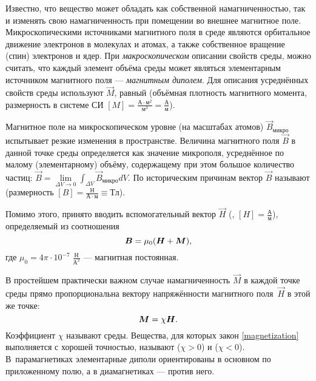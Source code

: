 
Известно, что вещество может обладать как собственной намагниченностью, так
и изменять свою намагниченность при помещении во внешнее магнитное поле.
Микроскопическими источниками магнитного поля в среде являются
орбитальное движение электронов в молекулах и атомах, а также собственное 
вращение (спин) электронов и ядер.
При \emph{макроскопическом} описании свойств среды, можно считать,
что каждый элемент объёма среды может являться элементарным источником
магнитного поля --- \emph{магнитным диполем}. Для описания усреднённых
свойств среды используют  $\vec{M}$, равный
(объёмная плотность магнитного момента, размерность в 
системе СИ $[M]=\frac{А\cdot м^2}{м^3}=\frac{А}{м}$).

Магнитное поле на микроскопическом уровне (на масштабах атомов) 
$\vec{B}_{\text{микро}}$ испытывает резкие изменения в пространстве.
Величина магнитного поля $\vec{B}$ в данной точке среды определяется как
значение микрополя, усреднённое по малому (элементарному) объёму, 
содержащему при этом большое количество частиц: 
$\vec{B}=\lim\limits_{\Delta V\to 0}\int_{\Delta V} \vec{B}_{микро}dV$.
По историческим причинам вектор $\vec{B}$ 
называют  (размерность $[B] = \frac{Н}{А\cdot м}\equiv  Тл$).

Помимо этого, принято вводить вспомогательный вектор $\vec{H}$
(, $[H]=\frac{А}{м}$), определяемый 
из соотношения
\begin{equation}
    \eqmark{fieldB}
    \vec{B} = \mu_0(\vec{H} + \vec{M}),
\end{equation}
где $\mu_0=4\pi \cdot 10^{-7}\;\frac{Н}{А^2}$ --- магнитная постоянная.

В простейшем практически важном случае намагниченность $\vec{M}$ в каждой
точке среды прямо пропорциональна вектору напряжённости магнитного
поля~$\vec{H}$ в этой же точке:
\begin{equation}
    \eqmark{magnetization}
    \vec{M} = \chi\vec{H}.
\end{equation}
Коэффициент $\chi$ называют  среды.
Вещества, для которых закон \eqref{magnetization} выполняется
с хорошей точностью, называют  ($\chi > 0$) и
 ($\chi < 0$).
В~парамагнетиках элементарные диполи
ориентированы в основном по приложенному полю,
а в диамагнетиках --- против него.

